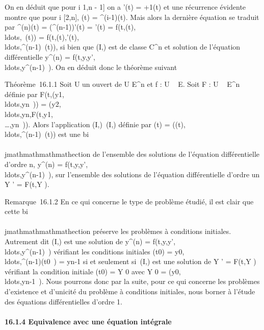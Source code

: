 On en déduit que pour i \in {[}1,n - 1{]} on a \phii'(t) =
\phii+1(t) et une récurrence évidente montre que pour i \in
{[}2,n{]}, \phii(t) = ^(i-1)(t). Mais alors la
dernière équation se traduit par ^(n)(t) =
(\phi^(n-1))'(t) = \phin'(t) =
f(t,(t),\\ldots,\phin~(t))
=
f(t,(t),'(t),\\ldots,^(n-1)~(t)),
si bien que (I,) est de classe C^n et solution de
l'équation différentielle y^(n) =
f(t,y,y',\\ldots,y^(n-1)~).
On en déduit donc le théorème suivant

Théorème~16.1.1 Soit U un ouvert de U \times E^n et f : U \rightarrow~ E.
Soit F : U \rightarrow~ E^n définie par
F(t,(y1,\\ldots,yn~))
=
(y2,\\ldots,yn,F(t,y1,\\\ldots,yn~)).
Alors l'application (I,\phi)\mapsto~(I,\Phi) définie par
\Phi(t) =
(\phi(t),\\ldots,\phi^(n-1)~(t))
est une bi\\\\jmathmathmathmathection de l'ensemble des solutions de l'équation
différentielle d'ordre n, y^(n) =
f(t,y,y',\\ldots,y^(n-1)~),
sur l'ensemble des solutions de l'équation différentielle d'ordre un Y '
= F(t,Y ).

Remarque~16.1.2 En ce qui concerne le type de problème étudié, il est
clair que cette bi\\\\jmathmathmathmathection préserve les problèmes à conditions initiales.
Autrement dit (I,\phi) est une solution de y^(n) =
f(t,y,y',\\ldots,y^(n-1)~)
vérifiant les conditions initiales \phi(t0) =
y0,\\ldots,\phi^(n-1)(t0~)
= yn-1 si et seulement si~(I,\Phi) est une solution de Y ' =
F(t,Y ) vérifiant la condition initiale \Phi(t0) = Y 0
avec Y 0 =
(y0,\\ldots,yn-1~).
Nous pourrons donc par la suite, pour ce qui concerne les problèmes
d'existence et d'unicité du problème à conditions initiales, nous borner
à l'étude des équations différentielles d'ordre 1.

\paragraph{16.1.4 Equivalence avec une équation intégrale}

